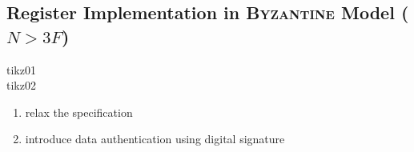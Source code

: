 \documentclass{article}
\begin{document}
\begin{adjustwidth}{2em}{2em}
		\subsection{Register Implementation in \textsc{Byzantine} Model ($N > 3F$)}
		\begin{adjustwidth}{2em}{2em}
			tikz01 \\
			tikz02 \\
			\begin{enumerate}[-]
				\item relax the specification
				\item introduce data authentication using digital signature
			\end{enumerate}
		\end{adjustwidth}
	\end{adjustwidth}
	
	\newpage
	
\end{document}
